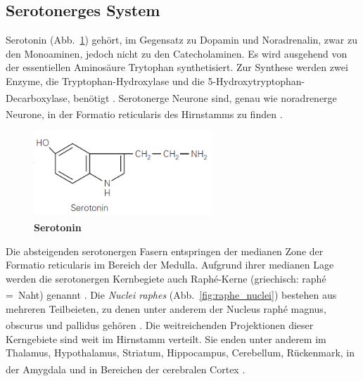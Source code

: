 \documentclass[12pt,a4paper,pdftex]{article}
\begin{document}
\subsection{Serotonerges System}
\label{serotonerges_system}
Serotonin (Abb.~\ref{fig:serotonin}) gehört, im Gegensatz zu Dopamin und Noradrenalin, zwar zu den Monoaminen, jedoch nicht zu den Catecholaminen. Es wird ausgehend von der essentiellen Aminosäure Trytophan synthetisiert. Zur Synthese werden zwei Enzyme, die Tryptophan-Hydroxylase und die 5-Hydroxytryptophan-Decarboxylase, benötigt \textsuperscript{\cite[13]{kandel2013principles}}. Serotonerge Neurone sind, genau wie noradrenerge Neurone, in der Formatio reticularis des Hirnstamms zu finden \textsuperscript{\cite[7]{trepel2011neuroanatomie}}.

\begin{figure}[H]
    \centering
    \includegraphics[width=0.6\textwidth]{pictures/Bilder_monoamine_systeme/serotonin.PNG}
    \caption{\textbf{Serotonin} \textsuperscript{\cite[13]{kandel2013principles}}}
    \label{fig:serotonin}
\end{figure}{}

Die absteigenden serotonergen Fasern entspringen der medianen Zone der Formatio reticularis im Bereich der Medulla. Aufgrund ihrer medianen Lage werden die serotonergen Kernbegiete auch Raphé-Kerne (griechisch: raphé =~Naht) genannt \textsuperscript{\cite[6]{trepel2011neuroanatomie}}. Die \textit{Nuclei raphes} (Abb.~\ref{fig:raphe_nuclei}) bestehen aus mehreren Teilbeieten, zu denen unter anderem der Nucleus raphé magnus, obscurus und pallidus gehören \textsuperscript{\cite[15]{paxinos2014rat}}. Die weitreichenden Projektionen dieser Kerngebiete sind weit im Hirnstamm verteilt. Sie enden unter anderem im Thalamus, Hypothalamus, Striatum, Hippocampus, Cerebellum, Rückenmark, in der Amygdala und in Bereichen der cerebralen Cortex \textsuperscript{\cite[9]{crossman2014neuroanatomy}}. 
\end{document}

